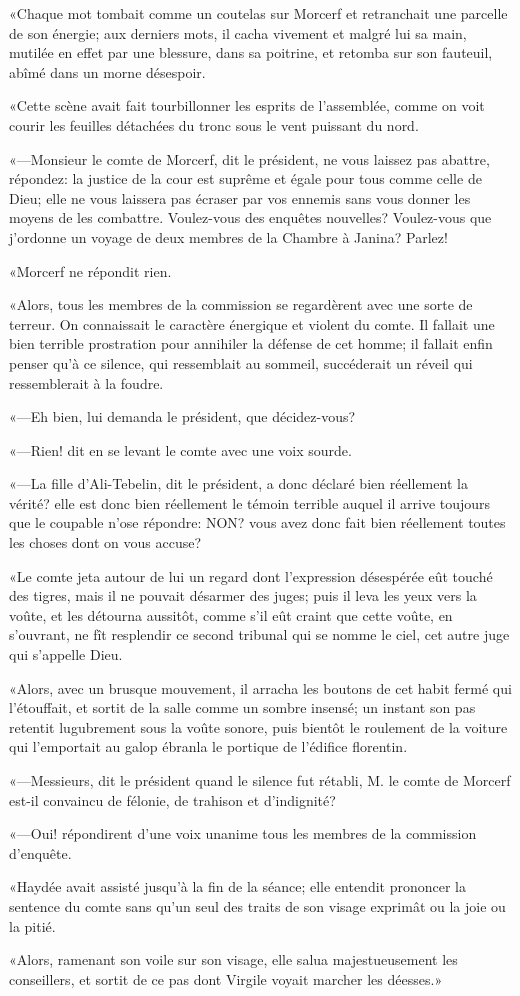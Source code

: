 «Chaque mot tombait comme un coutelas sur Morcerf et retranchait une parcelle de son énergie; aux derniers mots, il cacha vivement et malgré lui sa main, mutilée en effet par une blessure, dans sa poitrine, et retomba sur son fauteuil, abîmé dans un morne désespoir. 

«Cette scène avait fait tourbillonner les esprits de l'assemblée, comme on voit courir les feuilles détachées du tronc sous le vent puissant du nord. 

«—Monsieur le comte de Morcerf, dit le président, ne vous laissez pas abattre, répondez: la justice de la cour est suprême et égale pour tous comme celle de Dieu; elle ne vous laissera pas écraser par vos ennemis sans vous donner les moyens de les combattre. Voulez-vous des enquêtes nouvelles? Voulez-vous que j'ordonne un voyage de deux membres de la Chambre à Janina? Parlez! 

«Morcerf ne répondit rien. 

«Alors, tous les membres de la commission se regardèrent avec une sorte de terreur. On connaissait le caractère énergique et violent du comte. Il fallait une bien terrible prostration pour annihiler la défense de cet homme; il fallait enfin penser qu'à ce silence, qui ressemblait au sommeil, succéderait un réveil qui ressemblerait à la foudre. 

«—Eh bien, lui demanda le président, que décidez-vous? 

«—Rien! dit en se levant le comte avec une voix sourde. 

«—La fille d'Ali-Tebelin, dit le président, a donc déclaré bien réellement la vérité? elle est donc bien réellement le témoin terrible auquel il arrive toujours que le coupable n'ose répondre: NON? vous avez donc fait bien réellement toutes les choses dont on vous accuse? 

«Le comte jeta autour de lui un regard dont l'expression désespérée eût touché des tigres, mais il ne pouvait désarmer des juges; puis il leva les yeux vers la voûte, et les détourna aussitôt, comme s'il eût craint que cette voûte, en s'ouvrant, ne fît resplendir ce second tribunal qui se nomme le ciel, cet autre juge qui s'appelle Dieu. 

«Alors, avec un brusque mouvement, il arracha les boutons de cet habit fermé qui l'étouffait, et sortit de la salle comme un sombre insensé; un instant son pas retentit lugubrement sous la voûte sonore, puis bientôt le roulement de la voiture qui l'emportait au galop ébranla le portique de l'édifice florentin. 

«—Messieurs, dit le président quand le silence fut rétabli, M. le comte de Morcerf est-il convaincu de félonie, de trahison et d'indignité? 

«—Oui! répondirent d'une voix unanime tous les membres de la commission d'enquête. 

«Haydée avait assisté jusqu'à la fin de la séance; elle entendit prononcer la sentence du comte sans qu'un seul des traits de son visage exprimât ou la joie ou la pitié. 

«Alors, ramenant son voile sur son visage, elle salua majestueusement les conseillers, et sortit de ce pas dont Virgile voyait marcher les déesses.» 